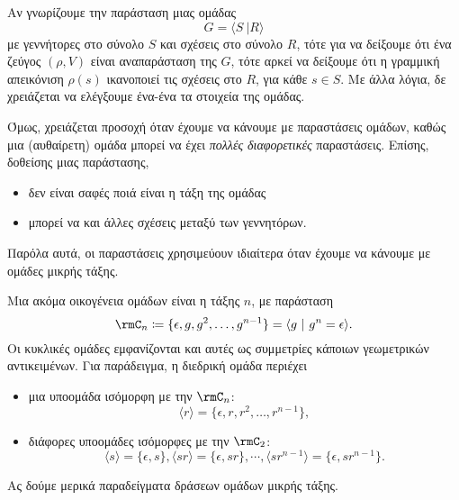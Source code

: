 \documentclass[12pt,a4paper,reqno]{amsart}
\theoremstyle{definition}
\newcommand{\defn}[1]{{\color{mylightblue}{#1}}}
\begin{document}
Αν γνωρίζουμε την παράσταση μιας ομάδας 
\[
G = \langle S \ \vert R \rangle
\]
με γεννήτορες στο σύνολο $S$ και σχέσεις στο σύνολο $R$, τότε για να δείξουμε ότι ένα ζεύγος $(\rho, V)$ είναι αναπαράσταση της $G$, τότε αρκεί να δείξουμε ότι η γραμμική απεικόνιση $\rho(s)$ ικανοποιεί τις σχέσεις στο $R$, για κάθε $s \in S$. Με άλλα λόγια, δε χρειάζεται να ελέγξουμε ένα-ένα τα στοιχεία της ομάδας.

Όμως, χρειάζεται προσοχή όταν έχουμε να κάνουμε με παραστάσεις ομάδων, καθώς μια (αυθαίρετη) ομάδα μπορεί να έχει \emph{πολλές διαφορετικές} παραστάσεις. Επίσης, δοθείσης μιας παράστασης,
\begin{itemize}
    \item δεν είναι σαφές ποιά είναι η τάξη της ομάδας
    \item μπορεί να  και άλλες σχέσεις μεταξύ των γεννητόρων.
\end{itemize}
Παρόλα αυτά, οι παραστάσεις χρησιμεύουν ιδιαίτερα όταν έχουμε να κάνουμε με ομάδες μικρής τάξης.

Μια ακόμα οικογένεια ομάδων είναι η \defn{κυκλική ομάδα} τάξης $n$, με παράσταση
\[
\rmC_n \coloneq \{\epsilon, g, g^2, \dots, g^{n-1}\} 
= \langle g \ \vert \ g^n = \epsilon \rangle.
\]
Οι κυκλικές ομάδες εμφανίζονται και αυτές ως συμμετρίες κάποιων γεωμετρικών αντικειμένων. Για παράδειγμα, η διεδρική ομάδα περιέχει
\begin{itemize}
    \item μια υποομάδα ισόμορφη με την $\rmC_n$:
    \[
    \langle r \rangle = \{\epsilon, r, r^2, \dots, r^{n-1}\},
    \]
    \item διάφορες υποομάδες ισόμορφες με την $\rmC_2$:
    \[
    \langle s \rangle = \{\epsilon, s\}, 
    \langle sr \rangle = \{\epsilon, sr\}, \cdots, 
    \langle sr^{n-1} \rangle = \{\epsilon, sr^{n-1}\}.
    \]
\end{itemize}

Ας δούμε μερικά παραδείγματα δράσεων ομάδων μικρής τάξης.
\end{document}
